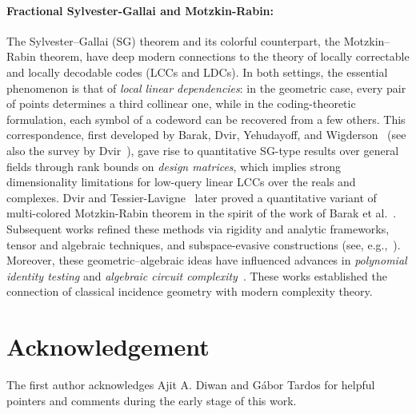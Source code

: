 \documentclass[a4paper,11pt,leqno]{article}
\begin{document}
\paragraph{Fractional Sylvester-Gallai and Motzkin-Rabin:}
The Sylvester--Gallai (SG) theorem and its colorful counterpart, the Motzkin--Rabin theorem, have deep modern connections to the theory of locally correctable and locally decodable codes (LCCs and LDCs).  In both settings, the essential phenomenon is that of \emph{local linear dependencies}: in the geometric case, every pair of points determines a third collinear one, while in the coding-theoretic formulation, each symbol of a codeword can be recovered from a few others.  This correspondence, first developed by Barak, Dvir, Yehudayoff, and Wigderson~\cite{BarakDYW11} (see also the survey by Dvir~\cite{Dvir12}), gave rise to quantitative SG-type results over general fields through rank bounds on \emph{design matrices}, which implies strong dimensionality limitations for low-query linear LCCs over the reals and complexes.  Dvir and Tessier-Lavigne~\cite{dvir2015quantitative} later proved a quantitative variant of multi-colored Motzkin-Rabin theorem in the spirit of the work of Barak et al.~\cite{BarakDYW11}. 
Subsequent works refined these methods via rigidity and analytic frameworks, tensor and algebraic techniques, and subspace-evasive constructions (see, e.g.,~\cite{DvirH16, bhattacharyya2011tight, dvir2012subspace, ai2014sylvester}). 
Moreover, these geometric--algebraic ideas have influenced advances in \emph{polynomial identity testing} and \emph{algebraic circuit complexity}~\cite{shpilka2019sylvester, saxena2013sylvester, dvir2014improved, oliveira2024strong}. These works established the connection of classical incidence geometry with modern complexity theory. 




\section{Acknowledgement}
The first author acknowledges Ajit A. Diwan and G\'{a}bor Tardos for helpful pointers and comments during the early stage of this work. 



%
%


\end{document}
